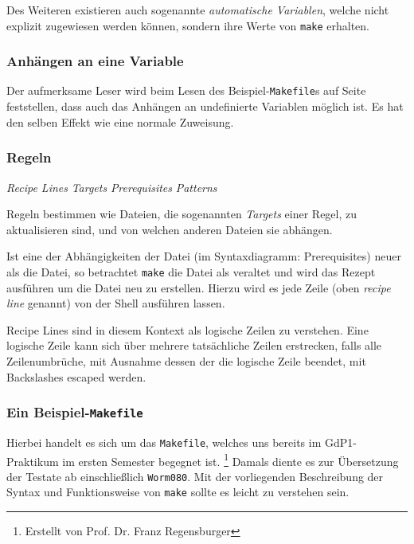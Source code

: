 		Des Weiteren existieren auch sogenannte \emph{automatische Variablen},
		welche nicht explizit zugewiesen werden können, sondern ihre Werte von
		\texttt{make} erhalten.

	\subsubsection*{Anhängen an eine Variable}
		
		Der aufmerksame Leser wird beim Lesen des Beispiel-\texttt{Makefile}s
		auf Seite~\pageref{subsubsection:examplemakefile} feststellen, dass
		auch das Anhängen an undefinierte Variablen möglich ist. Es hat den
		selben Effekt wie eine normale Zuweisung.

	\subsubsection*{Regeln}
		
		\textit{Recipe Lines} 
		\textit{Targets} 
		\textit{Prerequisites} 
		\clearpage
		\textit{Patterns} 

		Regeln bestimmen wie Dateien, die sogenannten \emph{Targets} einer
		Regel, zu aktualisieren sind, und von welchen anderen Dateien sie
		abhängen.

		Ist eine der Abhängigkeiten der Datei (im Syntaxdiagramm: Prerequisites)
		neuer als die Datei, so betrachtet \texttt{make} die Datei als veraltet
		und wird das Rezept ausführen um die Datei neu zu erstellen. Hierzu wird
		es jede Zeile (oben \textit{recipe line} genannt) von der Shell
		ausführen lassen.

		Recipe Lines sind in diesem Kontext als logische Zeilen zu verstehen.
		Eine logische Zeile kann sich über mehrere tatsächliche Zeilen
		erstrecken, falls alle Zeilenumbrüche, mit Ausnahme dessen der die
		logische Zeile beendet, mit Backslashes escaped werden.


		\clearpage
		\subsubsection{Ein Beispiel-\texttt{Makefile}}
			\label{subsubsection:examplemakefile}

			Hierbei handelt es sich um das \texttt{Makefile}, welches uns
			bereits im GdP1-Praktikum im ersten Semester begegnet ist.
			\footnote{Erstellt von Prof. Dr. Franz Regensburger} Damals diente
			es zur Übersetzung der Testate ab einschließlich \texttt{Worm080}.
			Mit der vorliegenden Beschreibung der Syntax und Funktionsweise von
			\texttt{make} sollte es leicht zu verstehen sein.

